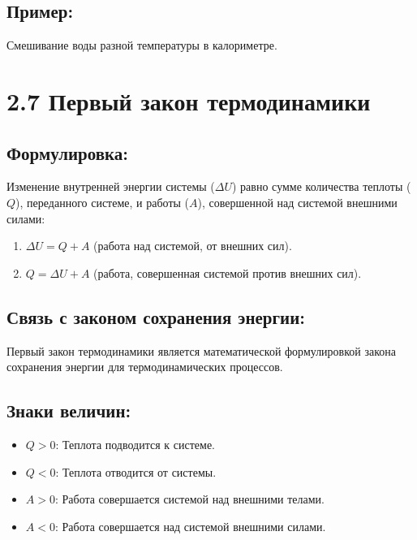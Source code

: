 \documentclass[a4paper,12pt]{article}
\begin{document}
\vspace{-9pt}
\subsection*{Пример:}
\vspace{-3pt}
Смешивание воды разной температуры в калориметре.



\section*{2.7 Первый закон термодинамики}
\vspace{-9pt}
\subsection*{Формулировка:}
\vspace{-3pt}
Изменение внутренней энергии системы ($\Delta U$) равно сумме количества теплоты ($Q$), переданного системе, и работы ($A$), совершенной над системой внешними силами:
\begin{enumerate}[itemsep=0pt, topsep=0pt, parsep=3pt]
    \item $\Delta U = Q + A$ (работа над системой, от внешних сил).
    \item $Q = \Delta U + A$ (работа, совершенная системой против внешних сил).
\end{enumerate}

\vspace{-9pt}
\subsection*{Связь с законом сохранения энергии:}
\vspace{-3pt}
Первый закон термодинамики является математической формулировкой закона сохранения энергии для термодинамических процессов.

\vspace{-9pt}
\subsection*{Знаки величин:}
\vspace{-3pt}
\begin{itemize}
    \item $Q > 0$: Теплота подводится к системе.
    \item $Q < 0$: Теплота отводится от системы.
    \item $A > 0$: Работа совершается системой над внешними телами.
    \item $A < 0$: Работа совершается над системой внешними силами.
\end{itemize}
\end{document}
